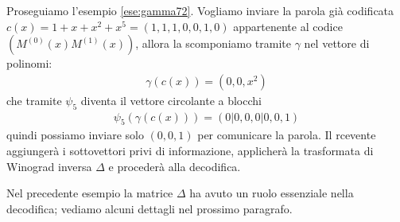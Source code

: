 \begin{esempio}
   Proseguiamo l'esempio \ref{ese:gamma72}. Vogliamo inviare la parola già codificata $c(x) = 1 + x + x^2 + x^5 = (1,1,1,0,0,1,0)$ appartenente al codice $(M^{(0)}(x)M^{(1)}(x))$, allora la scomponiamo tramite $\gamma$ nel vettore di polinomi:
   \begin{align*}
      \gamma(c(x)) = (0,0,x^2)
   \end{align*}
   che tramite $\psi_{5}$ diventa il vettore circolante a blocchi
   \begin{align*}
      \psi_{5}(\gamma(c(x))) = (0|0,0,0|0,0,1)
   \end{align*}
   quindi possiamo inviare solo $(0,0,1)$ per comunicare la parola. Il rcevente aggiungerà i sottovettori privi di informazione, applicherà la trasformata di Winograd inversa $\Delta$ e procederà alla decodifica.
\end{esempio}
Nel precedente esempio la matrice $\Delta$ ha avuto un ruolo essenziale nella decodifica; vediamo alcuni dettagli nel prossimo paragrafo.

